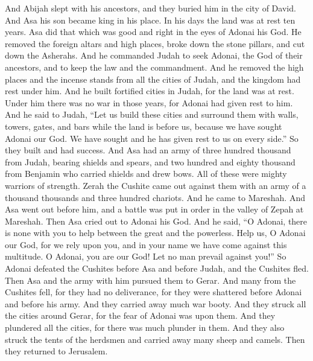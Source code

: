 \begin{biblechapter} %
  And Abijah slept with his ancestors, and they buried him in the city of David. And Asa his son became king in his place. In his days the land was at rest ten years.
\verse Asa did that which was good and right in the eyes of Adonai his God.
\verse He removed the foreign altars and high places, broke down the stone pillars, and cut down the Asherahs.
\verse And he commanded Judah to seek Adonai, the God of their ancestors, and to keep the law and the commandment.
\verse And he removed the high places and the incense stands from all the cities of Judah, and the kingdom had rest under him.
\verse And he built fortified cities in Judah, for the land was at rest. Under him there was no war in those years, for Adonai had given rest to him.
\verse And he said to Judah, “Let us build these cities and surround them with walls, towers, gates, and bars while the land is before us, because we have sought Adonai our God. We have sought and he has given rest to us on every side.” So they built and had success.
\verse And Asa had an army of three hundred thousand from Judah, bearing shields and spears, and two hundred and eighty thousand from Benjamin who carried shields and drew bows. All of these were mighty warriors of strength.
\verse Zerah the Cushite came out against them with an army of a thousand thousands and three hundred chariots. And he came to Mareshah.
\verse And Asa went out before him, and a battle was put in order in the valley of Zepah at Mareshah.
\verse Then Asa cried out to Adonai his God. And he said, “O Adonai, there is none with you to help between the great and the powerless. Help us, O Adonai our God, for we rely upon you, and in your name we have come against this multitude. O Adonai, you are our God! Let no man prevail against you!”
\verse So Adonai defeated the Cushites before Asa and before Judah, and the Cushites fled.
\verse Then Asa and the army with him pursued them to Gerar. And many from the Cushites fell, for they had no deliverance, for they were shattered before Adonai and before his army. And they carried away much war booty.
\verse And they struck all the cities around Gerar, for the fear of Adonai was upon them. And they plundered all the cities, for there was much plunder in them.
\verse And they also struck the tents of the herdsmen and carried away many sheep and camels. Then they returned to Jerusalem.
\end{biblechapter}

